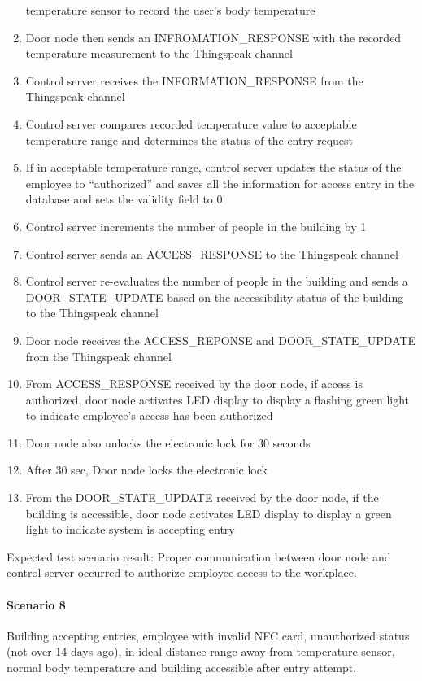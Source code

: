 \begin{enumerate}
          temperature sensor to record the user’s body temperature 
    \item Door node then sends an INFROMATION\_RESPONSE with the recorded
          temperature measurement to the Thingspeak channel 
    \item Control server receives the INFORMATION\_RESPONSE from the Thingspeak
          channel
    \item Control server compares recorded temperature value to acceptable
          temperature range and determines the status of the entry request
    \item If in acceptable temperature range, control server updates the status
          of the employee to “authorized” and saves all the information for
          access entry in the database and sets the validity field to 0
    \item Control server increments the number of people in the building by 1
    \item Control server sends an ACCESS\_RESPONSE to the Thingspeak channel
    \item Control server re-evaluates the number of people in the building and
          sends a DOOR\_STATE\_UPDATE based on the accessibility status of the
          building to the Thingspeak channel
    \item Door node receives the ACCESS\_REPONSE and DOOR\_STATE\_UPDATE from
          the Thingspeak channel
    \item From ACCESS\_RESPONSE received by the door node, if access is
          authorized, door node activates LED display to display a flashing
          green light to indicate employee’s access has been authorized 
    \item Door node also unlocks the electronic lock for 30 seconds
    \item After 30 sec, Door node locks the electronic lock
    \item From the DOOR\_STATE\_UPDATE received by the door node, if the
          building is accessible, door node activates LED display to display a
          green light to indicate system is accepting entry
\end{enumerate}

\noindent
Expected test scenario result: Proper communication between door node and
control server occurred to authorize employee access to the workplace.

\paragraph{Scenario 8}
Building accepting entries, employee with invalid NFC card, unauthorized status
(not over 14 days ago), in ideal distance range away from temperature sensor,
normal body temperature and building accessible after entry attempt.

